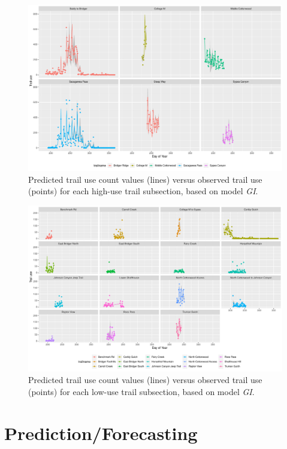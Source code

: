\documentclass[
]{book}
\begin{document}
\begin{figure}
\includegraphics[width=1\linewidth]{../figures/high_pred_modGI} \caption{Predicted trail use count values (lines) versus observed trail use (points) for each high-use trail subsection, based on model \emph{GI}.}\label{fig:high-pred-GI}
\end{figure}

\begin{figure}
\includegraphics[width=1\linewidth]{../figures/low_pred_modGI} \caption{Predicted trail use count values (lines) versus observed trail use (points) for each low-use trail subsection, based on model \emph{GI}.}\label{fig:low-pred-GI}
\end{figure}

\hypertarget{predictionforecasting}{%
\section{Prediction/Forecasting}\label{predictionforecasting}}
\end{document}

